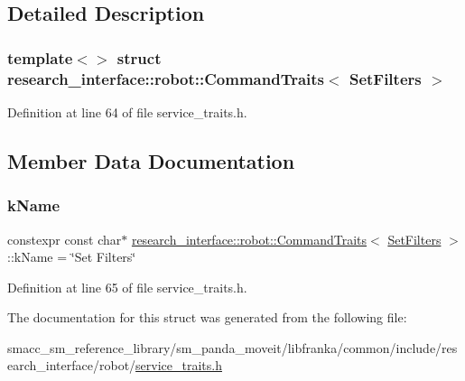 \subsection{Detailed Description}
\subsubsection*{template$<$$>$\newline
struct research\+\_\+interface\+::robot\+::\+Command\+Traits$<$ Set\+Filters $>$}



Definition at line 64 of file service\+\_\+traits.\+h.



\subsection{Member Data Documentation}
\mbox{\label{structresearch__interface_1_1robot_1_1CommandTraits_3_01SetFilters_01_4_a5a3d5120212b82f96867cff232a5f79a}} 
\subsubsection{\texorpdfstring{k\+Name}{kName}}
{\footnotesize\ttfamily constexpr const char$\ast$ \hyperlink{structresearch__interface_1_1robot_1_1CommandTraits}{research\+\_\+interface\+::robot\+::\+Command\+Traits}$<$ \hyperlink{structresearch__interface_1_1robot_1_1SetFilters}{Set\+Filters} $>$\+::k\+Name = \char`\"{}Set Filters\char`\"{}\hspace{0.3cm}{\ttfamily [static]}}



Definition at line 65 of file service\+\_\+traits.\+h.



The documentation for this struct was generated from the following file\+:\begin{DoxyCompactItemize}
\item 
smacc\+\_\+sm\+\_\+reference\+\_\+library/sm\+\_\+panda\+\_\+moveit/libfranka/common/include/research\+\_\+interface/robot/\hyperlink{service__traits_8h}{service\+\_\+traits.\+h}\end{DoxyCompactItemize}

